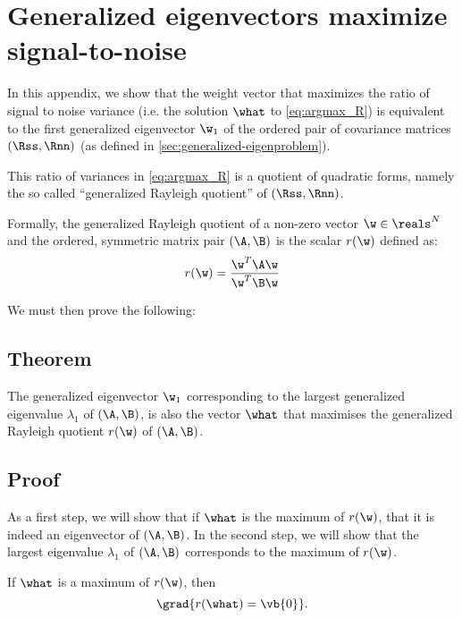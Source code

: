 \chapter{Generalized eigenvectors maximize signal-to-noise}
\label{apx:GEvecs-maximise-SNR}

In this appendix, we show that the weight vector that maximizes the ratio of signal to noise variance (i.e. the solution $\what$ to \cref{eq:argmax_R}) is equivalent to the first generalized eigenvector $\w_1$ of the ordered pair of covariance matrices $(\Rss, \Rnn)$ (as defined in \cref{sec:generalized-eigenproblem}).

This ratio of variances in \cref{eq:argmax_R} is a quotient of quadratic forms, namely the so called ``generalized Rayleigh quotient'' of $(\Rss, \Rnn)$.

Formally, the generalized Rayleigh quotient of a non-zero vector $\w \in \reals^N$ and the ordered, symmetric matrix pair $(\A,\B)$ is the scalar $r(\w)$ defined as:
%
\begin{equation}
\label{eq:Rayleigh}
r(\w) = \frac{\w^T \A \w}
             {\w^T \B \w}
\end{equation}

We must then prove the following:



\section{Theorem}

The generalized eigenvector $\w_1$ corresponding to the largest generalized eigenvalue $\lambda_1$ of $(\A,\B)$, is also the vector $\what$ that maximises the generalized Rayleigh quotient $r(\w)$ of $(\A,\B)$.




\section{Proof}

As a first step, we will show that if $\what$ is the maximum of $r(\w)$, that it is indeed an eigenvector of $(\A,\B)$. In the second step, we will show that the largest eigenvalue $\lambda_1$ of $(\A,\B)$ corresponds to the maximum of $r(\w)$.

If $\what$ is a maximum of $r(\w)$, then
\begin{equation}
\label{eq:critical}
\grad{r(\what) = \vb{0}}.
\end{equation}

